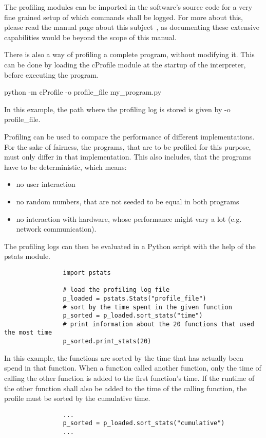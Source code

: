 			The profiling modules can be imported in the software's source code for a very fine grained setup of which commands shall be logged.
			For more about this, please read the manual page about this subject~\cite{Profiling}, as documenting these extensive capabilities would be beyond the scope of this manual.

			There is also a way of profiling a complete program, without modifying it.
			This can be done by loading the {\normalfont \ttfamily cProfile} module at the startup of the interpreter, before executing the program.
			\begin{center}
				{\normalfont \ttfamily python -m cProfile -o profile\_file my\_program.py}
			\end{center}
			In this example, the path where the profiling log is stored is given by {\normalfont \ttfamily -o profile\_file}.

			Profiling can be used to compare the performance of different implementations.
			For the sake of fairness, the programs, that are to be profiled for this purpose, must only differ in that implementation.
			This also includes, that the programs have to be deterministic, which means:
			\begin{itemize}
				\item no user interaction
				\item no random numbers, that are not seeded to be equal in both programs
				\item no interaction with hardware, whose performance might vary a lot (e.g. network communication).
			\end{itemize}

			The profiling logs can then be evaluated in a Python script with the help of the {\normalfont \ttfamily pstats} module.
			\begin{verbatim}
				import pstats

				# load the profiling log file
				p_loaded = pstats.Stats("profile_file")
				# sort by the time spent in the given function
				p_sorted = p_loaded.sort_stats("time")
				# print information about the 20 functions that used the most time
				p_sorted.print_stats(20)
			\end{verbatim}
			In this example, the functions are sorted by the time that has actually been spend in that function.
			When a function called another function, only the time of calling the other function is added to the first function's time.
			If the runtime of the other function shall also be added to the time of the calling function, the profile must be sorted by the cumulative time.
			\begin{verbatim}
				...
				p_sorted = p_loaded.sort_stats("cumulative")
				...
			\end{verbatim}


